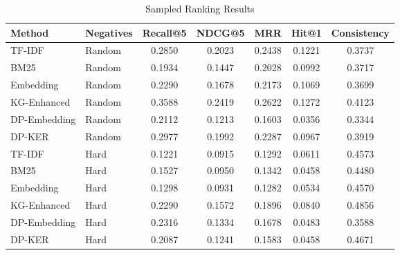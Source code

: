 \begin{table}[t]
\centering
\small
\caption{Sampled Ranking Results}
\label{tab:sampled_ranking_results}
\begin{tabular}{llccccc}
\hline
Method & Negatives & Recall@5 & NDCG@5 & MRR & Hit@1 & Consistency \\
\hline
TF-IDF & Random & 0.2850 & 0.2023 & 0.2438 & 0.1221 & 0.3737 \\
BM25 & Random & 0.1934 & 0.1447 & 0.2028 & 0.0992 & 0.3717 \\
Embedding & Random & 0.2290 & 0.1678 & 0.2173 & 0.1069 & 0.3699 \\
KG-Enhanced & Random & 0.3588 & 0.2419 & 0.2622 & 0.1272 & 0.4123 \\
DP-Embedding & Random & 0.2112 & 0.1213 & 0.1603 & 0.0356 & 0.3344 \\
DP-KER & Random & 0.2977 & 0.1992 & 0.2287 & 0.0967 & 0.3919 \\
TF-IDF & Hard & 0.1221 & 0.0915 & 0.1292 & 0.0611 & 0.4573 \\
BM25 & Hard & 0.1527 & 0.0950 & 0.1342 & 0.0458 & 0.4480 \\
Embedding & Hard & 0.1298 & 0.0931 & 0.1282 & 0.0534 & 0.4570 \\
KG-Enhanced & Hard & 0.2290 & 0.1572 & 0.1896 & 0.0840 & 0.4856 \\
DP-Embedding & Hard & 0.2316 & 0.1334 & 0.1678 & 0.0483 & 0.3588 \\
DP-KER & Hard & 0.2087 & 0.1241 & 0.1583 & 0.0458 & 0.4671 \\
\hline
\end{tabular}
\end{table}

